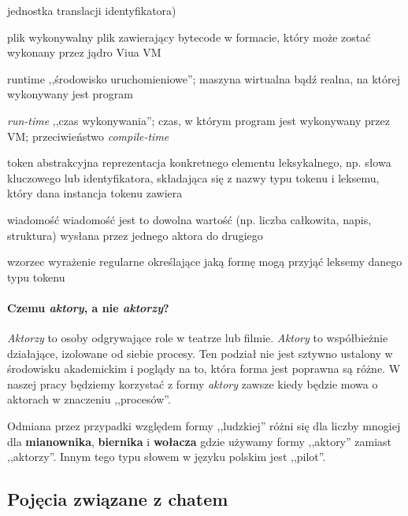 \begin{labeling}{jednostka translacji}
        identyfikatora)
    \item[plik wykonywalny] plik zawierający bytecode w formacie, który może zostać wykonany przez jądro Viua
        VM
    \item[runtime] ,,środowisko uruchomieniowe''; maszyna wirtualna bądź realna, na której
        wykonywany jest program
    \item[\emph{run-time}] ,,czas wykonywania''; czas, w którym program jest wykonywany przez VM;
        przeciwieństwo \emph{compile-time}
    \item[token] abstrakcyjna reprezentacja konkretnego elementu leksykalnego, np. słowa kluczowego lub
        identyfikatora, składająca się z nazwy typu tokenu i leksemu, który dana instancja tokenu zawiera
	\item[wiadomość] wiadomość jest to dowolna wartość (np. liczba całkowita,
		napis, struktura) wysłana przez jednego aktora do drugiego
    \item[wzorzec] wyrażenie regularne określające jaką formę mogą przyjąć leksemy danego typu tokenu
\end{labeling}

\paragraph*{Czemu \emph{aktory}, a nie \emph{aktorzy}?}
\label{glossary_actors}

\emph{Aktorzy} to osoby odgrywające role w teatrze lub filmie. \emph{Aktory} to
współbieżnie działające, izolowane od siebie procesy. Ten podział nie jest
sztywno ustalony w środowisku akademickim i poglądy na to, która forma jest
poprawna są różne. W naszej pracy będziemy korzystać z formy \emph{aktory}
zawsze kiedy będzie mowa o aktorach w znaczeniu ,,procesów''.

Odmiana przez przypadki względem formy ,,ludzkiej'' różni się dla liczby mnogiej
dla \textbf{mianownika}, \textbf{biernika} i \textbf{wołacza} gdzie używamy
formy ,,aktory'' zamiast ,,aktorzy''. Innym tego typu słowem w języku polskim
jest ,,pilot''.

\subsection{Pojęcia związane z chatem}
\label{slownik_pojec_chatu}

